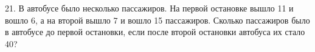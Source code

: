 21. В автобусе было несколько пассажиров. На первой остановке вышло 11 и вошло 6, а на второй вышло 7 и вошло 15 пассажиров. Сколько пассажиров было в автобусе до первой остановки, если после второй остановки автобуса их стало 40?\\
